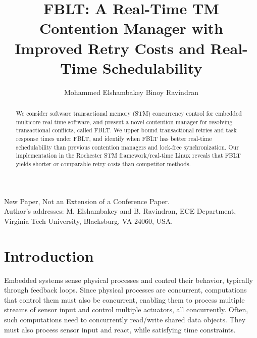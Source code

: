 \documentclass[prodmode,acmtecs]{acmsmall}
\begin{document}

\title{FBLT: A Real-Time TM Contention Manager with Improved Retry Costs and Real-Time Schedulability}

\author{Mohammed Elshambakey
Binoy Ravindran
}


\begin{abstract}
We consider software transactional memory (STM) concurrency control for embedded multicore real-time software, and present a novel contention manager for resolving transactional conflicts, called FBLT. We upper bound transactional retries and task response times under FBLT, and identify when FBLT has better real-time schedulability than previous contention managers and lock-free synchronization. Our implementation in the Rochester STM framework/real-time Linux reveals that FBLT yields shorter or comparable retry costs than competitor methods.
\end{abstract}





\begin{bottomstuff}
New Paper, Not an Extension of a Conference Paper.\\
Author's addresses: M. Elshambakey {and} B. Ravindran, ECE Department,
Virginia Tech University, Blacksburg, VA 24060, USA.
\end{bottomstuff}

\maketitle


\section{Introduction}

\label{sec:intro}

Embedded systems sense physical processes and control their behavior, typically through feedback loops. Since physical processes are concurrent, computations that control them must also be concurrent, enabling them to process multiple streams of sensor input and control multiple actuators, all concurrently. Often, such computations need to concurrently read/write shared data objects. They must also process sensor input and react, while satisfying time constraints. 
\end{document}
